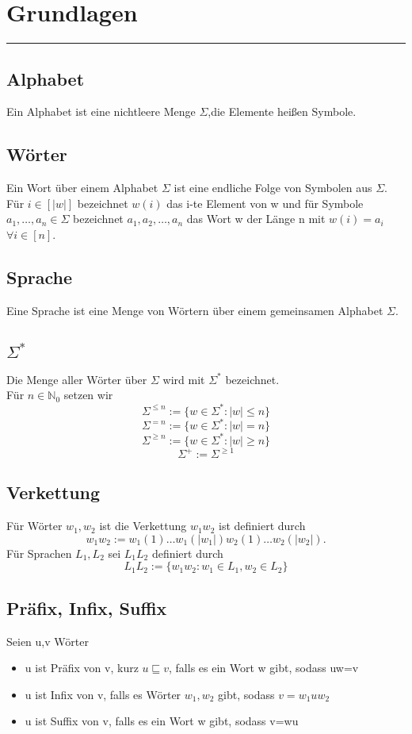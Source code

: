 \section{Grundlagen}
\rule{\textwidth}{0.4pt}
\subsection{Alphabet}
    Ein Alphabet ist eine nichtleere Menge \(\Sigma\),die Elemente heißen Symbole.
\subsection{Wörter}
    Ein Wort über einem Alphabet \(\Sigma\) ist eine endliche Folge von Symbolen aus \(\Sigma\).\\
    Für \(i\in[|w|]\) bezeichnet \(w(i)\) das i-te Element von w und für Symbole \(a_1,\dots,a_n\in \Sigma\)
    bezeichnet \(a_1,a_2,\dots,a_n\) das Wort w der Länge n mit \(w(i)=a_i\) \(\forall i\in [n]\).
\subsection{Sprache}
    Eine Sprache ist eine Menge von Wörtern über einem gemeinsamen Alphabet \(\Sigma\).
\subsection{\(\Sigma^*\)}
    Die Menge aller Wörter über \(\Sigma\) wird mit \(\Sigma^*\) bezeichnet.\\
    Für \(n\in\mathbb{N}_0\) setzen wir
    \[\Sigma^{\leq n}:=\{w\in\Sigma^*:|w|\leq n\}\]
    \[\Sigma^{=n}:=\{w\in\Sigma^*:|w|=n\}\]
    \[\Sigma^{\geq n}:=\{w\in\Sigma^*:|w|\geq n\}\]
    \[\Sigma^{+}:=\Sigma^{\geq 1}\]
\subsection{Verkettung}
    Für Wörter \(w_1,w_2\) ist die Verkettung \(w_1w_2\) ist definiert durch 
    \[w_1w_2:=w_1(1)\dots w_1(|w_1|)w_2(1)\dots w_2(|w_2|).\]
    Für Sprachen \(L_1,L_2\) sei \(L_1L_2\) definiert durch 
    \[L_1L_2:=\{w_1w_2:w_1\in L_1, w_2\in L_2\}\]
\subsection{Präfix, Infix, Suffix}
    Seien u,v Wörter 
    \begin{itemize}
        \item u ist Präfix von v, kurz \(u\sqsubseteq v\), falls es ein Wort w gibt, sodass uw=v 
        \item u ist Infix von v, falls es Wörter \(w_1,w_2\) gibt, sodass \(v=w_1uw_2\)
        \item u ist Suffix von v, falls es ein Wort w gibt, sodass v=wu
    \end{itemize}
